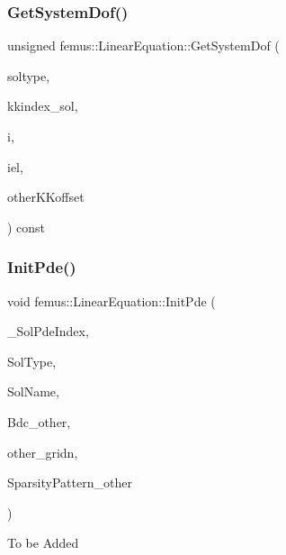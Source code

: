 \subsubsection{\texorpdfstring{Get\+System\+Dof()}{GetSystemDof()}\hspace{0.1cm}{\footnotesize\ttfamily [3/3]}}
{\footnotesize\ttfamily unsigned femus\+::\+Linear\+Equation\+::\+Get\+System\+Dof (\begin{DoxyParamCaption}\item[{const unsigned \&}]{soltype,  }\item[{const unsigned \&}]{kkindex\+\_\+sol,  }\item[{const unsigned \&}]{i,  }\item[{const unsigned \&}]{iel,  }\item[{const vector$<$ vector$<$ unsigned $>$ $>$ \&}]{other\+K\+Koffset }\end{DoxyParamCaption}) const}

\mbox{\label{classfemus_1_1_linear_equation_a2081cb3a1ffa45087e78fa1019010987}} 
\subsubsection{\texorpdfstring{Init\+Pde()}{InitPde()}}
{\footnotesize\ttfamily void femus\+::\+Linear\+Equation\+::\+Init\+Pde (\begin{DoxyParamCaption}\item[{const vector$<$ unsigned $>$ \&}]{\+\_\+\+Sol\+Pde\+Index,  }\item[{const vector$<$ int $>$ \&}]{Sol\+Type,  }\item[{const vector$<$ char $\ast$$>$ \&}]{Sol\+Name,  }\item[{vector$<$ \mbox{\hyperlink{classfemus_1_1_numeric_vector}{Numeric\+Vector}} $\ast$$>$ $\ast$}]{Bdc\+\_\+other,  }\item[{const unsigned \&}]{other\+\_\+gridn,  }\item[{vector$<$ bool $>$ \&}]{Sparsity\+Pattern\+\_\+other }\end{DoxyParamCaption})}

To be Added \mbox{\label{classfemus_1_1_linear_equation_a1beb93193b619ce9d6adae4977c2e993}} 

